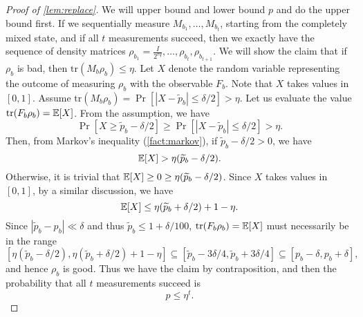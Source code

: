 \begin{proof}[Proof of \cref{lem:replace}]
    We will upper bound and lower bound $p$ and do the upper bound first. If we sequentially measure $M_{b_1},\ldots,M_{b_t}$, starting from the completely mixed state, and if all $t$ measurements succeed, then we exactly have the sequence of density matrices $\rho_{b_1}= \frac{I}{2^{rq}},\ldots,\rho_{b_t},\rho_{b_{t+1}}$. 
    We will show the claim that if $\rho_b$ is bad, then $\mathrm{tr}(M_b\rho_b)\leq \eta$. Let $X$ denote the random variable representing the outcome of measuring $\rho_b$ with the observable $F_b$. Note that $X$ takes values in $[0,1]$. Assume $\mathrm{tr}(M_b\rho_b)=\Pr[|X-\widetilde{p}_b|\leq\delta/2] > \eta$. Let us evaluate the value $\mathrm{tr}(F_b\rho_b) = \mathbb{E}[X]$. From the assumption, we have
    \[
        \Pr [ X \geq \widetilde{p}_b - \delta/2 ] \geq \Pr[|X-\widetilde{p}_b|\leq\delta/2] > \eta.
    \]
    Then, from Markov's inequality (\cref{fact:markov}), if $\widetilde{p}_b - \delta/2 >0$, we have
    \[
        \mathbb{E}[X] > \eta (\widetilde{p}_b - \delta/2).
    \]
    Otherwise, it is trivial that $\mathbb{E}[X] \geq 0 \geq \eta (\widetilde{p}_b - \delta/2)$. Since $X$ takes values in $[0,1]$, by a similar discussion, we have
    \[
        \mathbb{E}[X] \leq \eta (\widetilde{p}_b + \delta/2) + 1 - \eta.
    \]
    Since $|\widetilde{p}_b-p_b| \ll \delta$ and thus $\widetilde{p}_b \leq 1 + \delta/100$, $\mathrm{tr}(F_b\rho_b) = \mathbb{E}[X]$ must necessarily be in the range
    \[
        [\eta (\widetilde{p}_b - \delta/2), \eta (\widetilde{p}_b + \delta/2) + 1-\eta] \subseteq [\widetilde{p}_b - 3\delta/4, \widetilde{p}_b + 3\delta/4] \subseteq [p_b - \delta, p_b + \delta],
    \]
    and hence $\rho_b$ is good. Thus we have the claim by contraposition, and then the probability that all $t$ measurements succeed is 
    \begin{equation}\label{eq:upper_bound}
        p\leq \eta^t.
    \end{equation}


\end{proof}

